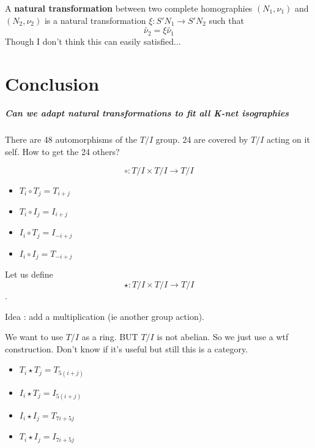 \documentclass{report}
\begin{document}
\begin{defn}
    A \textbf{natural transformation} between two complete homographies $(N_1,\nu_1)$ and $(N_2,\nu_2)$ is a natural transformation $\xi : S'N_1\rightarrow S'N_2$ such that 
    \begin{equation}
        \widetilde{\nu_2}= \xi\widetilde{\nu_1}
    \end{equation}
    Though I don't think this can easily satisfied...
\end{defn}







\chapter{Conclusion}

\paragraph{Can we adapt natural transformations to fit all K-net isographies}
There are 48 automorphisms of the $T/I$ group. 24 are covered by $T/I$ acting on it self. How to get the 24 others?

$$\circ : T/I \times T/I \rightarrow T/I$$

\begin{itemize}
    \item $T_i \circ T_j = T_{i + j}$
    \item $T_i \circ I_j = I_{i + j}$
    \item $I_i \circ T_j = I_{-i + j}$
    \item $I_i \circ I_j = T_{-i + j}$
\end{itemize}

Let us define
$$\star : T/I \times T/I \rightarrow T/I$$.

Idea : add a multiplication (ie another group action).

We want to use $T/I$ as a ring. BUT $T/I$ is not abelian. So we just use a wtf construction. Don't know if it's useful but still this is a category.
\begin{itemize}
    \item $T_i \star T_j = T_{5(i + j)}$
    \item $I_i \star T_j = I_{5(i + j)}$
    \item $I_i \star I_j = T_{7i + 5j}$
    \item $T_i \star I_j = I_{7i + 5j}$
\end{itemize}
\end{document}
